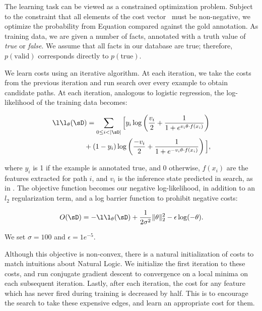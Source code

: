The learning task can be viewed as a constrained optimization problem.
Subject to the constraint that all elements of the cost vector \btheta\ 
  must be non-negative, we optimize the probability from
  Equation  compared against the gold annotation.
As training data, we are given a number of facts, annotated with a
  truth value of \textit{true} or \textit{false}.
We assume that all facts in our database are true; therefore,
  $p(\textrm{valid})$ corresponds directly to $p(\textrm{true})$.

We learn costs using an iterative algorithm.
At each iteration, we take the costs from the previous iteration
  and run search over every example to obtain candidate paths.
At each iteration, analogous to logistic regression,
  the log-likelihood of the training data becomes:

\begin{align*}
\l\l_\theta(\sD&) = \sum_{0 \leq i < |\sD|} \Big[
    y_i \log \left(\frac{v_i}{2} + \frac{1}{1 + e^{v_i \theta \cdot f(x_i)}} \right) \\
    &+ (1 - y_i) \log \left(\frac{-v_i}{2} + \frac{1}{1 + e^{-v_i \theta \cdot f(x_i)}} \right)
  \Big],
\end{align*}

\noindent where $y_i$ is 1 if the example is annotated true, and 0
  otherwise, $f(x_i)$ are the features extracted for path $i$, and
  $v_i$ is the inference state predicted in search, as in
  .
The objective function becomes our negative log-likelihood, in addition
  to an $l_2$ regularization term, and a log barrier function to 
  prohibit negative costs:

\begin{equation*}
O(\sD) = -\l\l_\theta(\sD) 
  + \frac{1}{2 \sigma^2}\|\theta\|_2^2
  - \epsilon \log(-\theta).
\end{equation*}

\noindent We set $\sigma=100$ and $\epsilon=1e^{-5}$.

Although this objective is non-convex, there is a natural initialization
  of costs to match intuitions about Natural Logic.
We initialize the first iteration to these costs, and run
  conjugate gradient descent to convergence on a local minima
  on each subsequent iteration.
Lastly, after each iteration, the cost for any feature which has
  never fired during training is decreased by half.
This is to encourage the search to take these expensive edges, and
  learn an appropriate cost for them.



